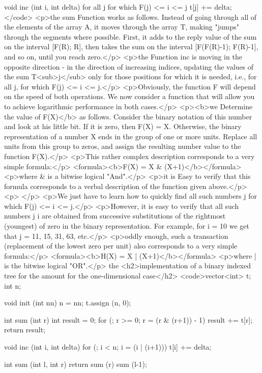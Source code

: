 void inc (int i, int delta)
{
for all j for which F(j) <= i <= j
{
t[j] += delta;
}
}</code>
<p>the sum Function works as follows. Instead of going through all of the elements of the array A, it moves through the array T, making "jumps" through the segments where possible. First, it adds to the reply value of the sum on the interval [F(R); R], then takes the sum on the interval [F(F(R)-1); F(R)-1], and so on, until you reach zero.</p>
<p>the Function inc is moving in the opposite direction - in the direction of increasing indices, updating the values of the sum T<sub>j</sub> only for those positions for which it is needed, i.e., for all j, for which F(j) <= i <= j.</p>
<p>Obviously, the function F will depend on the speed of both operations. We now consider a function that will allow you to achieve logarithmic performance in both cases.</p>
<p><b>we Determine the value of F(X)</b> as follows. Consider the binary notation of this number and look at his little bit. If it is zero, then F(X) = X. Otherwise, the binary representation of a number X ends in the group of one or more units. Replace all units from this group to zeros, and assign the resulting number value to the function F(X).</p>
<p>This rather complex description corresponds to a very simple formula:</p>
<formula><b>F(X) = X & (X+1)</b></formula>
<p>where & is a bitwise logical "And".</p>
<p>it is Easy to verify that this formula corresponds to a verbal description of the function given above.</p>
<p> </p>
<p>We just have to learn how to quickly find all such numbers j for which F(j) <= i <= j.</p>
<p>However, it is easy to verify that all such numbers j i are obtained from successive substitutions of the rightmost (youngest) of zero in the binary representation. For example, for i = 10 we get that j = 11, 15, 31, 63, etc.</p>
<p>oddly enough, such a transaction (replacement of the lowest zero per unit) also corresponds to a very simple formula:</p>
<formula><b>H(X) = X | (X+1)</b></formula>
<p>where | is the bitwise logical "OR".</p>
the <h2>implementation of a binary indexed tree for the amount for the one-dimensional case</h2>
<code>vector<int> t;
int n;

void init (int nn)
{
n = nn;
t.assign (n, 0);
}

int sum (int r)
{
int result = 0;
for (; r >= 0; r = (r & (r+1)) - 1)
result += t[r];
return result;
}

void inc (int i, int delta)
{
for (; i < n; i = (i | (i+1)))
t[i] += delta;
}

int sum (int l, int r)
{
return sum (r) sum (l-1);
}

